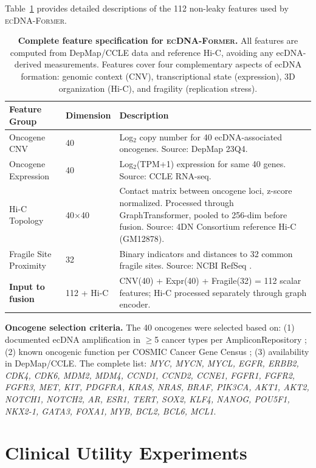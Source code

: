 \documentclass{article}
\newcommand{\former}{\textsc{ecDNA-Former}}
\begin{document}
Table~\ref{tab:feature_details} provides detailed descriptions of the 112 non-leaky features used by \former{}.

\begin{table}[h]
\caption{\textbf{Complete feature specification for \former{}.} All features are computed from DepMap/CCLE data and reference Hi-C, avoiding any ecDNA-derived measurements. Features cover four complementary aspects of ecDNA formation: genomic context (CNV), transcriptional state (expression), 3D organization (Hi-C), and fragility (replication stress).}
\label{tab:feature_details}
\centering
\small
\begin{tabular}{@{}p{2.5cm}p{1.5cm}p{6cm}@{}}
\toprule
Feature Group & Dimension & Description \\
\midrule
Oncogene CNV & 40 & Log$_2$ copy number for 40 ecDNA-associated oncogenes. Source: DepMap 23Q4. \\
Oncogene Expression & 40 & Log$_2$(TPM+1) expression for same 40 genes. Source: CCLE RNA-seq. \\
Hi-C Topology & 40$\times$40 & Contact matrix between oncogene loci, z-score normalized. Processed through GraphTransformer, pooled to 256-dim before fusion. Source: 4DN Consortium \citep{4dn_2017} reference Hi-C (GM12878). \\
Fragile Site Proximity & 32 & Binary indicators and distances to 32 common fragile sites. Source: NCBI RefSeq \citep{refseq_2016}. \\
\midrule
\textbf{Input to fusion} & 112 + Hi-C & CNV(40) + Expr(40) + Fragile(32) = 112 scalar features; Hi-C processed separately through graph encoder. \\
\bottomrule
\end{tabular}
\end{table}

\textbf{Oncogene selection criteria.} The 40 oncogenes were selected based on: (1) documented ecDNA amplification in $\geq$5 cancer types per AmpliconRepository \citep{kim_2020_amplicon_repo}; (2) known oncogenic function per COSMIC Cancer Gene Census \citep{cosmic_2019}; (3) availability in DepMap/CCLE. The complete list: \textit{MYC, MYCN, MYCL, EGFR, ERBB2, CDK4, CDK6, MDM2, MDM4, CCND1, CCND2, CCNE1, FGFR1, FGFR2, FGFR3, MET, KIT, PDGFRA, KRAS, NRAS, BRAF, PIK3CA, AKT1, AKT2, NOTCH1, NOTCH2, AR, ESR1, TERT, SOX2, KLF4, NANOG, POU5F1, NKX2-1, GATA3, FOXA1, MYB, BCL2, BCL6, MCL1}.


\section{Clinical Utility Experiments}
\label{app:utility}
\end{document}
